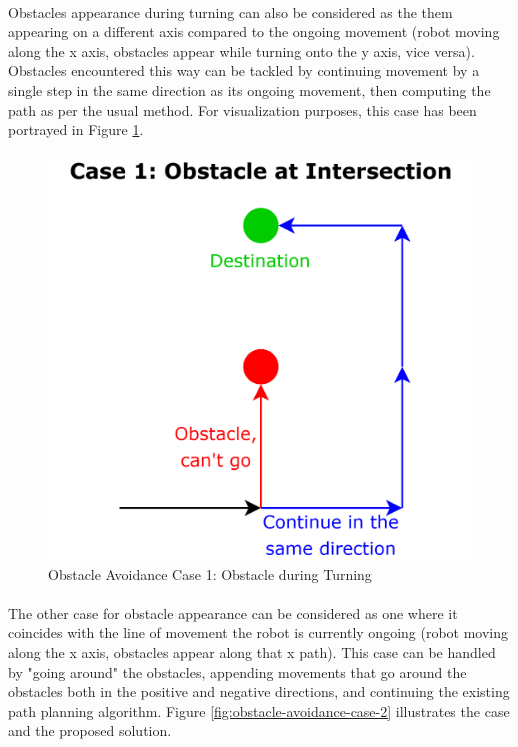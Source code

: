 \paragraph*{}
Obstacles appearance during turning can also be considered as the them appearing on a different axis compared to the ongoing movement (robot moving along the x axis, obstacles appear while turning onto the y axis, vice versa). Obstacles encountered this way can be tackled by continuing movement by a single step in the same direction as its ongoing movement, then computing the path as per the usual method. For visualization purposes, this case has been portrayed in Figure \ref{fig:obstacle-avoidance-case-1}.

\begin{figure} [H]
    \centering
    \includegraphics[width=0.55\linewidth]{assets/images/formation/obstacle-avoidance-case1.png}
    \caption{Obstacle Avoidance Case 1: Obstacle during Turning}
    \label{fig:obstacle-avoidance-case-1}
\end{figure}

\paragraph*{}
The other case for obstacle appearance can be considered as one where it coincides with the line of movement the robot is currently ongoing (robot moving along the x axis, obstacles appear along that x path). This case can be handled by "going around" the obstacles, appending movements that go around the obstacles both in the positive and negative directions, and continuing the existing path planning algorithm. Figure \ref{fig:obstacle-avoidance-case-2} illustrates the case and the proposed solution.

